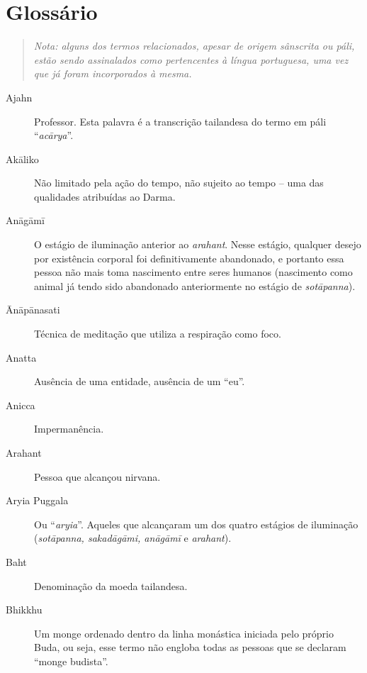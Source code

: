 
\chapter{Glossário}

\begin{quote}
\itshape Nota: alguns dos termos relacionados, apesar de origem sânscrita ou páli, estão sendo assinalados como pertencentes à língua portuguesa, uma vez que já foram incorporados à mesma.
\end{quote}

\begin{description}

  \item[Ajahn] Professor. Esta palavra é a transcrição tailandesa do termo em páli “\emph{acārya}”.

  \item[Akāliko] Não limitado pela ação do tempo, não sujeito ao tempo – uma das qualidades atribuídas ao Darma.

  \item[Anāgāmī] O estágio de iluminação anterior ao \emph{arahant}. Nesse estágio, qualquer desejo por existência corporal foi definitivamente abandonado, e portanto essa pessoa não mais toma nascimento entre seres humanos (nascimento como animal já tendo sido abandonado anteriormente no estágio de \emph{sotāpanna}).

  \item[Ānāpānasati] Técnica de meditação que utiliza a respiração como foco.

  \item[Anatta] Ausência de uma entidade, ausência de um “eu”.

  \item[Anicca] Impermanência.

  \item[Arahant] Pessoa que alcançou nirvana.

  \item[Aryia Puggala] Ou “\emph{aryia}”. Aqueles que alcançaram um dos quatro estágios de iluminação (\emph{sotāpanna, sakadāgāmi, anāgāmī} e \emph{arahant}).

  \item[Baht] Denominação da moeda tailandesa.

  \item[Bhikkhu] Um monge ordenado dentro da linha monástica iniciada pelo próprio Buda, ou seja, esse termo não engloba todas as pessoas que se declaram “monge budista”.


\end{description}
